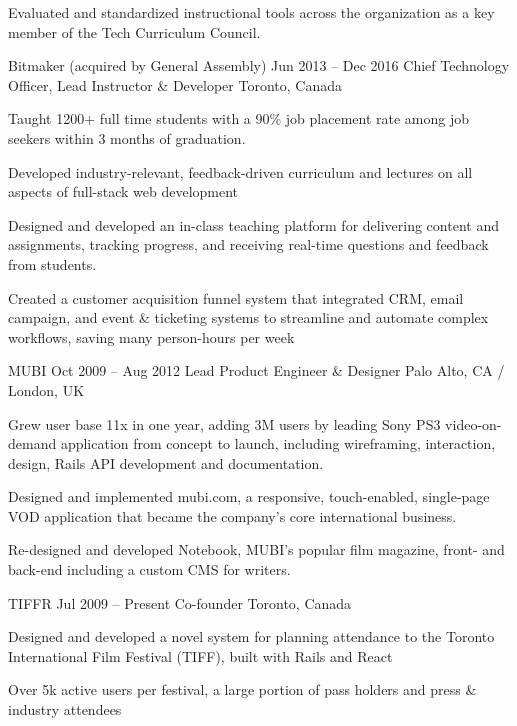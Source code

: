 \documentclass[10pt]{article}
\begin{document}
{{\begin{newitemize}
		\item {Evaluated and standardized instructional tools across the organization as a key member of the Tech Curriculum Council.}
		\end{newitemize}}
	\pagebreak
	\job
	{Bitmaker (acquired by General Assembly)}
	{Jun 2013 – Dec 2016}
	{Chief Technology Officer, Lead Instructor \& Developer}
	{Toronto, Canada}
	{\begin{newitemize}
		\item {Taught 1200+ full time students with a 90\% job placement rate among job seekers within 3 months of graduation.}
		\item {Developed industry-relevant, feedback-driven curriculum and lectures on all aspects of full-stack web development}
		\item {Designed and developed an in-class teaching platform for delivering content and assignments, tracking progress, and receiving real-time questions and feedback from students.}
		\item {Created a customer acquisition funnel system that integrated CRM, email campaign, and event \& ticketing systems to streamline and automate complex workflows, saving many person-hours per week}
		\end{newitemize}}
	\job
	{MUBI}
	{Oct 2009 – Aug 2012}
	{Lead Product Engineer \& Designer}
	{Palo Alto, CA / London, UK}
	{\begin{newitemize}
		\item {Grew user base 11x in one year, adding 3M users by leading Sony PS3 video-on-demand application from concept to launch, including wireframing, interaction, design, Rails API development and documentation.}
		\item {Designed and implemented mubi.com, a responsive, touch-enabled, single-page VOD application that became the company’s core international business.}
		\item {Re-designed and developed Notebook, MUBI’s popular film magazine, front- and back-end including a custom CMS for writers.}
		\end{newitemize}}
	\job
	{TIFFR}
	{Jul 2009 – Present}
	{Co-founder}
	{Toronto, Canada}
	{\begin{newitemize}
		\item {Designed and developed a novel system for planning attendance to the Toronto International Film Festival (TIFF), built with Rails and React}
		\item {Over 5k active users per festival, a large portion of pass holders and press \& industry attendees}

\end{newitemize}}}
\end{document}
